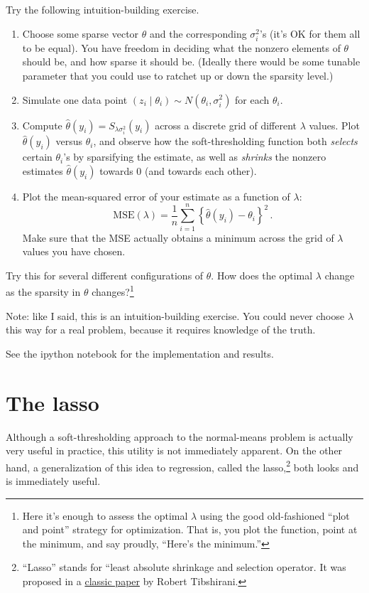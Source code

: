 \documentclass{article}
\begin{document}
\begin{enumerate}[label=(\Alph*)]
Try the following intuition-building exercise.
\begin{enumerate}[label=\arabic*.]
\item Choose some sparse vector $\theta$ and the corresponding $\sigma_i^2$'s (it's OK for them all to be equal).  You have freedom in deciding what the nonzero elements of $\theta$ should be, and how sparse it should be.  (Ideally there would be some tunable parameter that you could use to ratchet up or down the sparsity level.)
\item Simulate one data point $(z_i \mid \theta_i) \sim N(\theta_i, \sigma^2_i)$ for each $\theta_i$.
\item Compute $\widehat{\theta}(y_i) = S_{\lambda \sigma_i^2}(y_i)$ across a discrete grid of different $\lambda$ values.  Plot $\widehat{\theta}(y_i)$ versus $\theta_i$, and observe how the soft-thresholding function both \emph{selects} certain $\theta_i$'s by sparsifying the estimate, as well as \emph{shrinks} the nonzero estimates $\widehat{\theta}(y_i)$ towards 0 (and towards each other).
\item Plot the mean-squared error of your estimate as a function of $\lambda$:
$$
\mbox{MSE}(\lambda) = \frac{1}{n} \sum_{i=1}^n  \left\{ \widehat{\theta}(y_i) - \theta_i \right\}^2 \, .
$$
Make sure that the MSE actually obtains a minimum across the grid of $\lambda$ values you have chosen.
\end{enumerate}
Try this for several different configurations of $\theta$.  How does the optimal $\lambda$ change as the sparsity in $\theta$ changes?\footnote{Here it's enough to assess the optimal $\lambda$ using the good old-fashioned ``plot and point'' strategy for optimization.  That is, you plot the function, point at the minimum, and say proudly, ``Here's the minimum.''}

Note: like I said, this is an intuition-building exercise.  You could never choose $\lambda$ this way for a real problem, because it requires knowledge of the truth.


{\color{blue}
See the ipython notebook for the implementation and results.
}

\end{enumerate}


\section{The lasso}

Although  a soft-thresholding approach to the normal-means problem is actually very useful in practice, this utility is not immediately apparent.  On the other hand, a generalization of this idea to regression, called the lasso,\footnote{``Lasso'' stands for ``least absolute shrinkage and selection operator.  It was proposed in a \href{http://statweb.stanford.edu/~tibs/lasso/lasso.pdf}{classic paper} by Robert Tibshirani.} both looks and is immediately useful.
\end{document}
